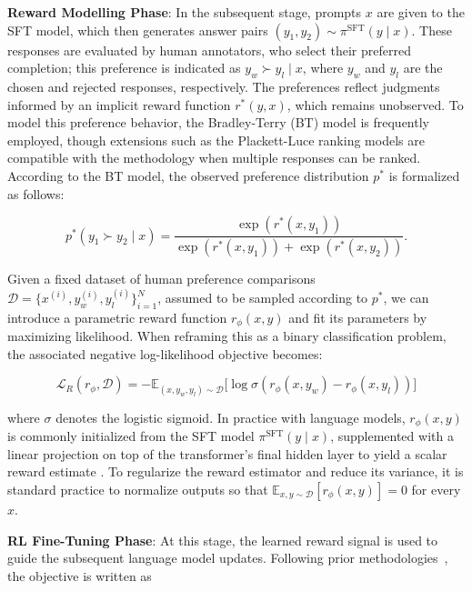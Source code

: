 \textbf{Reward Modelling Phase}: In the subsequent stage, prompts $x$ are given to the SFT model, which then generates answer pairs $(y_1, y_2)\sim \pi^\text{SFT}(y \mid x)$. These responses are evaluated by human annotators, who select their preferred completion; this preference is indicated as $y_w\succ y_l \mid x$, where $y_w$ and $y_l$ are the chosen and rejected responses, respectively. The preferences reflect judgments informed by an implicit reward function $r^*(y, x)$, which remains unobserved. To model this preference behavior, the Bradley-Terry (BT) model \cite{bradley1952rankanalysis} is frequently employed, though extensions such as the Plackett-Luce ranking models \citep{plackett1975analysis, luce2012individual} are compatible with the methodology when multiple responses can be ranked. According to the BT model, the observed preference distribution $p^*$ is formalized as follows:

\begin{equation}\label{eq:bradley-terry}
    p^*(y_1\succ y_2 \mid x)=\frac{\exp\left(r^*(x, y_1)\right)}{\exp\left(r^*(x, y_1)\right) + \exp\left(r^*(x, y_2)\right)}.
\end{equation}

Given a fixed dataset of human preference comparisons $\mathcal{D}=\bigl\{x^{(i)}, y_w^{(i)}, y_l^{(i)}\bigr\}_{i=1}^N$, assumed to be sampled according to $p^*$, we can introduce a parametric reward function $r_{\phi}(x, y)$ and fit its parameters by maximizing likelihood. When reframing this as a binary classification problem, the associated negative log-likelihood objective becomes:

\begin{equation}\label{eq:reward_model}
    \mathcal{L}_R(r_{\phi}, \mathcal{D}) = -\mathbb{E}_{(x, y_w, y_l)\sim \mathcal{D}}\bigl[\log \sigma(r_{\phi}(x, y_w)- r_{\phi}(x, y_l))\bigr]
\end{equation}

where $\sigma$ denotes the logistic sigmoid. In practice with language models, $r_{\phi}(x, y)$ is commonly initialized from the SFT model $\pi^\text{SFT}(y \mid x)$, supplemented with a linear projection on top of the transformer’s final hidden layer to yield a scalar reward estimate \cite{ziegler2020finetuning}. To regularize the reward estimator and reduce its variance, it is standard practice to normalize outputs so that $\mathbb{E}_{x,y\sim \mathcal{D}}\left[r_\phi(x, y)\right] = 0$ for every $x$.

\textbf{RL Fine-Tuning Phase}: At this stage, the learned reward signal is used to guide the subsequent language model updates. Following prior methodologies~\citep{jaques2017sequence, jaques2020human}, the objective is written as

